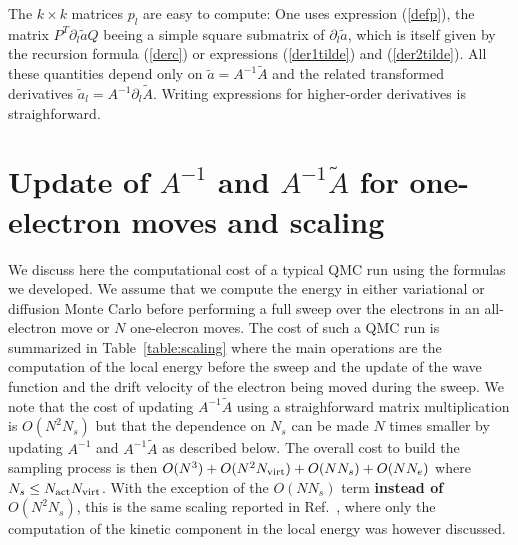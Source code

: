 \documentclass[aip,jcp,reprint,floatfix,onecolumn]{revtex4-1}
\begin{document}
The $k \times k$ matrices $p_l$ are easy to compute: One uses expression (\ref{defp}), the matrix $P^T\partial_l \tilde{a}Q$ beeing  a
simple square submatrix of $\partial_l \tilde{a}$, which is itself given by the recursion formula (\ref{derc}) or expressions (\ref{der1tilde}) and
(\ref{der2tilde}).  All these quantities depend only on $\tilde{a}=A^{-1}\tilde{A}$ and the related transformed derivatives
$\tilde{a}_l=A^{-1}\partial_l \tilde{A}$.  Writing expressions for higher-order derivatives is straighforward.

\section{Update of $A^{-1}$ and $A^{-1}\tilde{A}$ for one-electron moves and scaling}
\label{updateinv}

We discuss here the computational cost of a typical QMC run using the formulas we developed.  We assume that we compute the energy
in either variational or diffusion Monte Carlo before performing a full sweep over the electrons in an all-electron move or $N$ one-elecron moves.
The cost of such a QMC run is summarized in Table~\ref{table:scaling} where the main operations are the computation of the local
energy before the sweep and the update of the wave function and the drift velocity of the electron being moved during the sweep.
We note that the cost of updating $A^{-1}\tilde{A}$ using a straighforward matrix multiplication is $O(N^2 N_s)$ but that the dependence on $N_s$ can
be made $N$ times  smaller  by updating $A^{-1}$ and $A^{-1}\tilde{A}$ as described below.
The overall cost to build the sampling process is then $O(N^3) + O(N^2 N_{\rm virt})+ O (N N_s) + O(N N_e)$ where $N_s\leq N_{\rm act}N_{\rm virt}$.
With the exception of the $O (N N_s)$ term {\bf instead of $O(N^2 N_s)$}, this is the same scaling reported in Ref.~, where only the computation of the kinetic  component in the local energy was however discussed.
\end{document}
